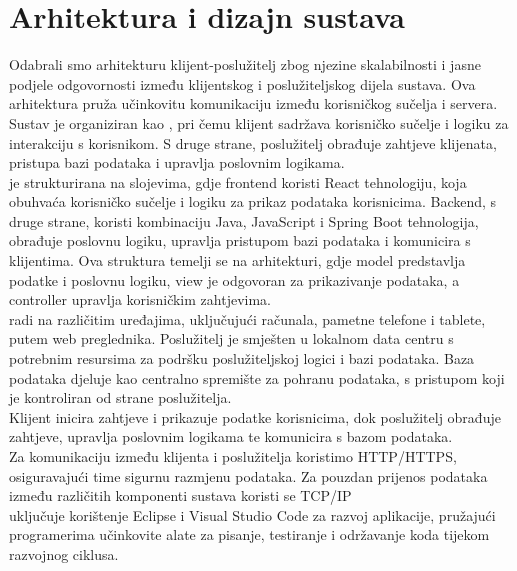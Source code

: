 \chapter{Arhitektura i dizajn sustava}
		
		\indent Odabrali smo arhitekturu klijent-poslužitelj zbog njezine skalabilnosti i jasne podjele odgovornosti između klijentskog i poslužiteljskog dijela sustava. Ova arhitektura pruža učinkovitu komunikaciju između korisničkog sučelja i servera. \\
		
		\indent Sustav je organiziran kao \textit{}, pri čemu klijent sadržava korisničko sučelje i logiku za interakciju s korisnikom. S druge strane, poslužitelj obrađuje zahtjeve klijenata, pristupa bazi podataka i upravlja poslovnim logikama. \\
		
		\indent \textit{} je strukturirana na slojevima, gdje frontend koristi React tehnologiju, koja obuhvaća korisničko sučelje i logiku za prikaz podataka korisnicima. Backend, s druge strane, koristi kombinaciju Java, JavaScript i Spring Boot tehnologija, obrađuje poslovnu logiku, upravlja pristupom bazi podataka i komunicira s klijentima. Ova struktura temelji se na \textit{} arhitekturi, gdje model predstavlja podatke i poslovnu logiku, view je odgovoran za prikazivanje podataka, a controller upravlja korisničkim zahtjevima. \\
		
		\indent \textit{} radi na različitim uređajima, uključujući računala, pametne telefone i tablete, putem web preglednika. Poslužitelj je smješten u lokalnom data centru s potrebnim resursima za podršku poslužiteljskoj logici i bazi podataka. Baza podataka djeluje kao centralno spremište za pohranu podataka, s pristupom koji je kontroliran od strane poslužitelja. \\
		
		\indent Klijent inicira zahtjeve i prikazuje podatke korisnicima, dok poslužitelj obrađuje zahtjeve, upravlja poslovnim logikama te komunicira s bazom podataka. \\
		\indent Za komunikaciju između klijenta i poslužitelja koristimo HTTP/HTTPS, osiguravajući time sigurnu razmjenu podataka. Za pouzdan prijenos podataka između različitih komponenti sustava koristi se TCP/IP \\
		
		\indent \textit{} uključuje korištenje Eclipse i Visual Studio Code za razvoj aplikacije, pružajući programerima učinkovite alate za pisanje, testiranje i održavanje koda tijekom razvojnog ciklusa. \\
				
